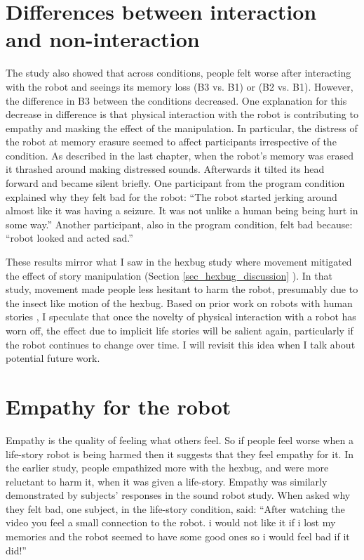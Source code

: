 \section{Differences between interaction and non-interaction}

The study also showed that across conditions, people felt worse after interacting with the robot and seeings its memory loss (B3 vs. B1) or (B2 vs. B1). However, the difference in B3 between the conditions decreased. One explanation for this decrease in difference is that physical interaction with the robot is contributing to empathy and masking the effect of the manipulation. In particular, the distress of the robot at memory erasure seemed to affect participants irrespective of the condition.  As described in the last chapter, when the robot's memory was erased it thrashed around making distressed sounds. Afterwards it tilted its head forward and became silent briefly. One participant from the program condition explained why they felt bad for the robot: ``The robot started jerking around almost like it was having a seizure. It was not unlike a human being being hurt in some way.'' Another participant, also in the program condition, felt bad because: ``robot looked and acted sad.'' 

These results mirror what I saw in the hexbug study where movement mitigated the effect of story manipulation (Section \ref{sec_hexbug_discussion} ). In that study, movement made people less hesitant to harm the robot, presumably due to the insect like motion of the hexbug. Based on prior work on robots with human stories \cite{gockley_valerie_roboreceptionist}, I speculate that once the novelty of physical interaction with a robot has worn off, the effect due to implicit life stories will be salient again, particularly if the robot continues to change over time. I will revisit this idea when I talk about potential future work.


\section{Empathy for the robot}


Empathy is the quality of feeling what others feel. So if people feel worse when a life-story robot is being harmed then it suggests that they feel empathy for it. In the earlier study, people empathized more with the hexbug, and were more reluctant to harm it, when it was given a life-story. Empathy was similarly demonstrated by subjects' responses in the sound robot study. When asked why they felt bad, one subject, in the life-story condition, said: ``After watching the video you feel a small connection to the robot. i would not like it if i lost my memories and the robot seemed to have some good ones so i would feel bad if it did!''

